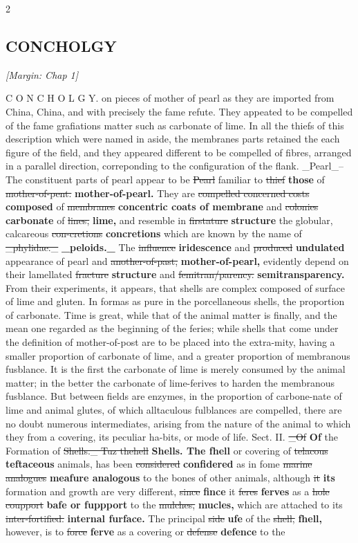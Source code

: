 \documentclass[10pt]{article}
\begin{document}
\begin{multicols}{2}
\subsection*{CONCHOLGY}
{\small\itshape [Margin: Chap 1]}\par
C O N C H O L G Y. on pieces of mother of pearl as they are imported from China, China, and with precisely the fame refute. They appeated to be compelled of the fame grafiations matter such as carbonate of lime. In all the thiefs of this description which were named in aside, the membranes parts retained the each figure of the field, and they appeared different to be compelled of fibres, arranged in a parallel direction, correponding to the configuration of the flank. \_Pearl\_--The constituent parts of pearl appear to be \sout{Pearl} familiar to \sout{thief} \textbf{those} of \sout{mother-of-pent.} \textbf{mother-of-pearl.} They are \sout{compelled concerned costs} \textbf{composed} of \sout{membranes} \textbf{concentric coats of membrane} and \sout{colonies} \textbf{carbonate} of \sout{lines,} \textbf{lime,} and resemble in \sout{firstature} \textbf{structure} the globular, calcareous \sout{con-cretions} \textbf{concretions} which are known by the name of \sout{\_phylidae.\_} \textbf{\_peloids.\_} The \sout{influence} \textbf{iridescence} and \sout{produced} \textbf{undulated} appearance of pearl and \sout{another-of-past,} \textbf{mother-of-pearl,} evidently depend on their lamellated \sout{fracture} \textbf{structure} and \sout{femitran/parency.} \textbf{semitransparency.} From their experiments, it appears, that shells are complex composed of surface of lime and gluten. In formas as pure in the porcellaneous shells, the proportion of carbonate. Time is great, while that of the animal matter is finally, and the mean one regarded as the beginning of the feries; while shells that come under the definition of mother-of-post are to be placed into the extra-mity, having a smaller proportion of carbonate of lime, and a greater proportion of membranous fusblance. It is the first the carbonate of lime is merely consumed by the animal matter; in the better the carbonate of lime-ferives to harden the membranous fusblance. But between fields are enzymes, in the proportion of carbone-nate of lime and animal glutes, of which alltaculous fulblances are compelled, there are no doubt numerous intermediates, arising from the nature of the animal to which they from a covering, its peculiar ha-bits, or mode of life. Sect. II. \sout{\_Of} \textbf{Of} the Formation of \sout{Shells.\_ Tuz thehell} \textbf{Shells. The fhell} or covering of \sout{telacous} \textbf{teftaceous} animals, has been \sout{considered} \textbf{confidered} as in fome \sout{marine analogues} \textbf{meafure analogous} to the bones of other animals, although \sout{it} \textbf{its} formation and growth are very different, \sout{since} \textbf{fince} it \sout{feres} \textbf{ferves} as a \sout{hole coupport} \textbf{bafe or fuppport} to the \sout{mulches,} \textbf{mucles,} which are attached to its \sout{inter-fortified.} \textbf{internal furface.} The principal \sout{side} \textbf{ufe} of the \sout{shell,} \textbf{fhell,} however, is to \sout{force} \textbf{ferve} as a covering or \sout{defense} \textbf{defence} to the 
\end{multicols}
\end{document}

